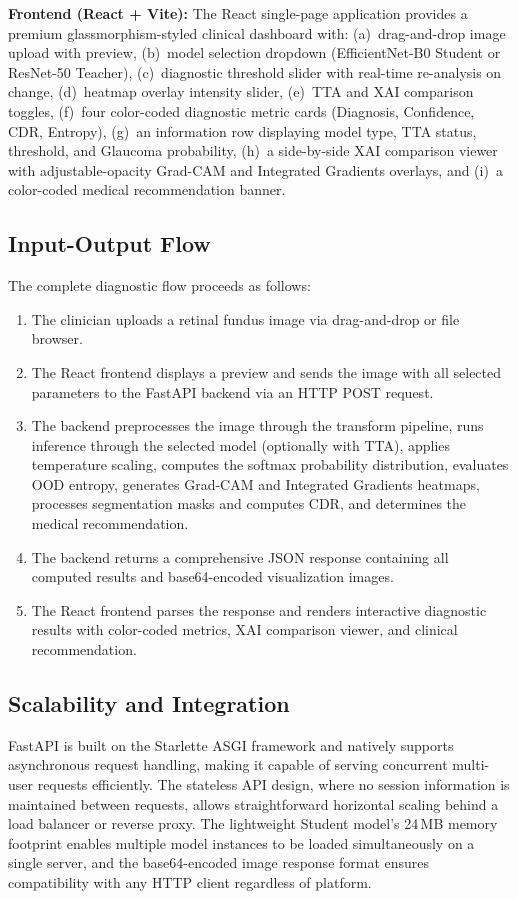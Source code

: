 \documentclass[conference]{IEEEtran}
\begin{document}
\textbf{Frontend (React + Vite):} The React single-page application provides a premium glassmorphism-styled clinical dashboard with: (a)~drag-and-drop image upload with preview, (b)~model selection dropdown (EfficientNet-B0 Student or ResNet-50 Teacher), (c)~diagnostic threshold slider with real-time re-analysis on change, (d)~heatmap overlay intensity slider, (e)~TTA and XAI comparison toggles, (f)~four color-coded diagnostic metric cards (Diagnosis, Confidence, CDR, Entropy), (g)~an information row displaying model type, TTA status, threshold, and Glaucoma probability, (h)~a side-by-side XAI comparison viewer with adjustable-opacity Grad-CAM and Integrated Gradients overlays, and (i)~a color-coded medical recommendation banner.

\subsection{Input-Output Flow}
The complete diagnostic flow proceeds as follows:
\begin{enumerate}
    \item The clinician uploads a retinal fundus image via drag-and-drop or file browser.
    \item The React frontend displays a preview and sends the image with all selected parameters to the FastAPI backend via an HTTP POST request.
    \item The backend preprocesses the image through the transform pipeline, runs inference through the selected model (optionally with TTA), applies temperature scaling, computes the softmax probability distribution, evaluates OOD entropy, generates Grad-CAM and Integrated Gradients heatmaps, processes segmentation masks and computes CDR, and determines the medical recommendation.
    \item The backend returns a comprehensive JSON response containing all computed results and base64-encoded visualization images.
    \item The React frontend parses the response and renders interactive diagnostic results with color-coded metrics, XAI comparison viewer, and clinical recommendation.
\end{enumerate}

\subsection{Scalability and Integration}
FastAPI is built on the Starlette ASGI framework and natively supports asynchronous request handling, making it capable of serving concurrent multi-user requests efficiently. The stateless API design, where no session information is maintained between requests, allows straightforward horizontal scaling behind a load balancer or reverse proxy. The lightweight Student model's 24\,MB memory footprint enables multiple model instances to be loaded simultaneously on a single server, and the base64-encoded image response format ensures compatibility with any HTTP client regardless of platform.
\end{document}

